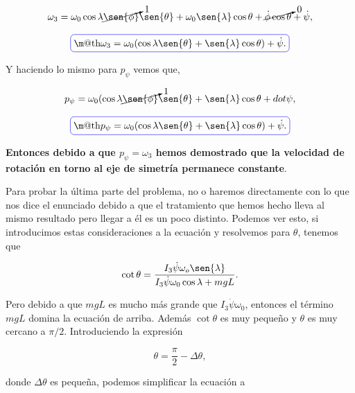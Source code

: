 \documentclass[a4paper,10pt]{article}
\makeatletter
\numberwithin{equation}{section}
\newcommand*{\boxcolor}{blue}
\renewcommand{\boxed}[1]{\textcolor{\boxcolor}{%
\tikz[baseline={([yshift=-1ex]current bounding box.center)}] \node [rectangle, minimum width=1ex,rounded corners,draw] {\normalcolor\m@th$\displaystyle#1$};}}
\makeatother
\begin{document}
\begin{equation}
 \omega_3 = \omega_0\cos{\lambda}\cancelto{1}{\sen{\phi}}\sen{\theta} + \omega_0\sen{\lambda}\cos{\theta} + 
 \cancelto{0}{\dot{\phi}\cos{\theta}} + \dot{\psi},
\end{equation}

\begin{equation}
 \boxed{\omega_3 = \omega_0(\cos{\lambda}\sen{\theta} + \sen{\lambda}\cos{\theta}) + \dot{\psi}.}
\end{equation}

Y haciendo lo mismo para $p_\psi$ vemos que,

\begin{equation}
 p_\psi = \omega_0(\cos{\lambda}\cancelto{1}{\sen{\phi}}\sen{\theta}+ 
 \sen{\lambda}\cos{\theta} + dot{\psi},
\end{equation}

\begin{equation}
 \boxed{p_\psi = \omega_0(\cos{\lambda}\sen{\theta} + \sen{\lambda}\cos{\theta}) + \dot{\psi}.}
\end{equation}

\textbf{Entonces debido a que $p_\psi = \omega_3$ hemos demostrado que la velocidad de rotación 
en torno al eje de simetría permanece constante}.

Para probar la última parte del problema, no o haremos directamente con lo que nos dice 
el enunciado debido a que el tratamiento que hemos hecho lleva al mismo resultado 
pero llegar a él es un poco distinto. Podemos ver esto, si introducimos estas consideraciones a la ecuación 
 y resolvemos para $\theta$, tenemos que 

\begin{equation}
 \cot{\theta} = \frac{I_3\dot{\psi}\omega_o\sen{\lambda}}{I_3\dot{\psi}\omega_0\cos{\lambda} + mgL}.
\label{eq:cotangenteTheta}
\end{equation}

Pero debido a que $mgL$ es mucho más grande que $I_3\dot{\psi}\omega_0$, entonces el término 
$mgL$ domina la ecuación de arriba. Además $\cot{\theta}$ es muy pequeño y $\theta$ es 
muy cercano a $\pi/2$. Introduciendo la expresión

\begin{equation}
 \theta = \frac{\pi}{2} - \Delta\theta,
\end{equation}

donde $\Delta\theta$ es pequeña, podemos simplificar la ecuación 
a 
\end{document}
